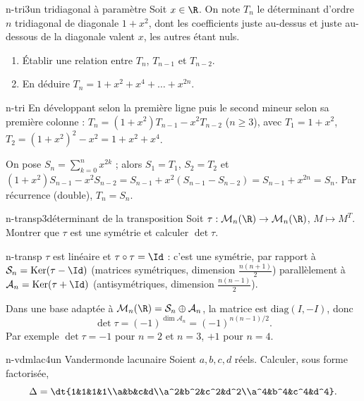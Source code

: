 \begin{exo}{n-tri}{3}{un tridiagonal à paramètre}
Soit $x\in\R$. On note $T_n$ le déterminant d'ordre $n$ tridiagonal de diagonale $1+x^2$, dont les coefficients juste au-dessus et juste au-dessous de la diagonale valent $x$, les autres étant nuls.
\begin{enumerate}
\item Établir une relation entre $T_n$, $T_{n-1}$ et $T_{n-2}$.
\item En déduire $T_n=1+x^2+x^4+\dots+x^{2n}$.
\end{enumerate}
\end{exo}

\begin{corrige}{n-tri}
 En développant selon la première ligne puis le second mineur selon sa première colonne : $T_n=(1+x^2)T_{n-1}-x^2T_{n-2}$ ($n\geq3$), avec $T_1=1+x^2$, $T_2=(1+x^2)^2-x^2=1+x^2+x^4$.

 On pose $S_n=\sum_{k=0}^nx^{2k}$ ; alors $S_1=T_1$, $S_2=T_2$ et
$(1+x^2)S_{n-1}-x^2S_{n-2}=S_{n-1}+x^2(S_{n-1}-S_{n-2})=S_{n-1}+x^{2n}=S_n$. Par récurrence (double), $T_n=S_n$.
\end{corrige}

\begin{exo}{n-transp}{3}{déterminant de la transposition}
Soit $\tau:\mathcal M_n(\R)\to\mathcal M_n(\R)$, $M\mapsto M^T$. Montrer que $\tau$ est une symétrie et calculer $\det\tau$.
\end{exo}

\begin{corrige}{n-transp}
$\tau$ est linéaire et $\tau\circ\tau=\Id$ : c'est une symétrie, par rapport à $\mathcal S_n=\mathrm{Ker}(\tau-\Id)$ (matrices symétriques, dimension $\frac{n(n+1)}2$) parallèlement à $\mathcal A_n=\mathrm{Ker}(\tau+\Id)$ (antisymétriques, dimension $\frac{n(n-1)}2$).

Dans une base adaptée à $\mathcal M_n(\R)=\mathcal S_n\oplus\mathcal A_n$, la matrice est $\mathrm{diag}(I,-I)$, donc
\[\det\tau=(-1)^{\dim\mathcal A_n}=(-1)^{n(n-1)/2}.\]
Par exemple $\det\tau=-1$ pour $n=2$ et $n=3$, $+1$ pour $n=4$.
\end{corrige}

\begin{exo}{n-vdmlac}{4}{un Vandermonde lacunaire}
Soient $a,b,c,d$ réels. Calculer, sous forme factorisée,
\[\Delta=\dt{1&1&1&1\\a&b&c&d\\a^2&b^2&c^2&d^2\\a^4&b^4&c^4&d^4}.\]
\end{exo}


